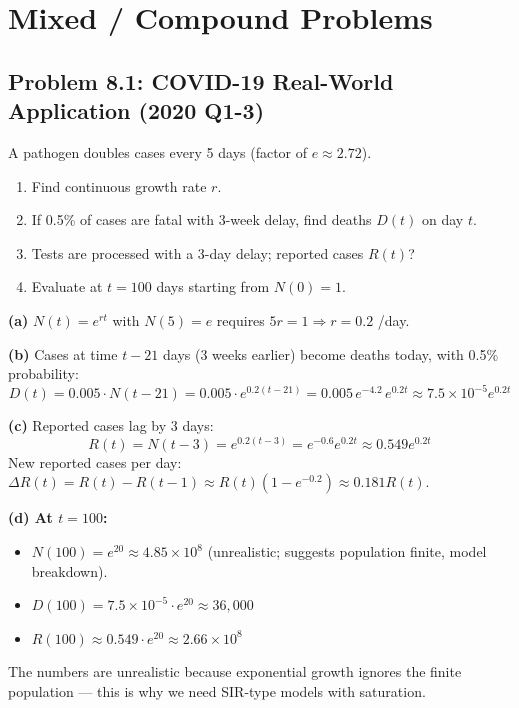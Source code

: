 \documentclass[10pt]{article}
\begin{document}
\newpage
\section{Mixed / Compound Problems}

\subsection{Problem 8.1: COVID-19 Real-World Application (2020 Q1-3)}

\begin{problem}
A pathogen doubles cases every 5 days (factor of $e \approx 2.72$).
\begin{enumerate}[label=(\alph*)]
\item Find continuous growth rate $r$.
\item If 0.5\% of cases are fatal with 3-week delay, find deaths $D(t)$ on day $t$.
\item Tests are processed with a 3-day delay; reported cases $R(t)$?
\item Evaluate at $t = 100$ days starting from $N(0) = 1$.
\end{enumerate}
\end{problem}

\begin{solution}
\textbf{(a)} $N(t) = e^{rt}$ with $N(5) = e$ requires $5r = 1 \Rightarrow r = 0.2$ /day.

\textbf{(b)} Cases at time $t - 21$ days (3 weeks earlier) become deaths today, with 0.5\% probability:
\[
D(t) = 0.005 \cdot N(t-21) = 0.005 \cdot e^{0.2(t-21)} = 0.005\,e^{-4.2}\,e^{0.2t} \approx 7.5 \times 10^{-5} e^{0.2t}
\]

\textbf{(c)} Reported cases lag by 3 days:
\[
R(t) = N(t-3) = e^{0.2(t-3)} = e^{-0.6} e^{0.2t} \approx 0.549 e^{0.2t}
\]
New reported cases per day: $\Delta R(t) = R(t) - R(t-1) \approx R(t)(1 - e^{-0.2}) \approx 0.181 R(t)$.

\textbf{(d) At $t = 100$:}
\begin{itemize}
\item $N(100) = e^{20} \approx 4.85 \times 10^8$ (unrealistic; suggests population finite, model breakdown).
\item $D(100) = 7.5 \times 10^{-5} \cdot e^{20} \approx 36{,}000$
\item $R(100) \approx 0.549 \cdot e^{20} \approx 2.66 \times 10^8$
\end{itemize}
The numbers are unrealistic because exponential growth ignores the finite population — this is why we need SIR-type models with saturation.
\end{solution}
\end{document}
